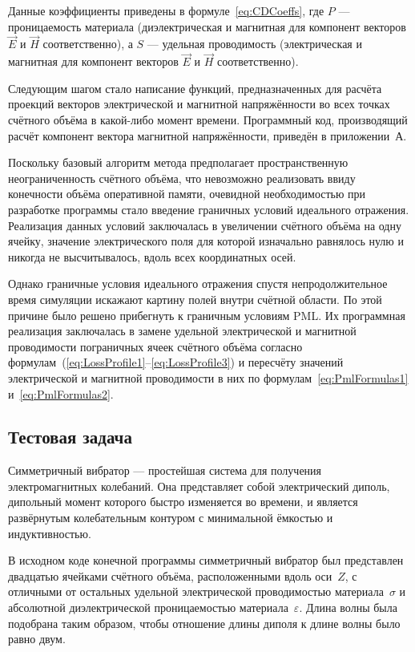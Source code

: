 Данные коэффициенты приведены в формуле~\eqref{eq:CDCoeffs}, где $ P $ --- проницаемость материала (диэлектрическая и магнитная для компонент векторов $\vec{E}$  и $\vec{H}$ соответственно), а $S$ --- удельная проводимость (электрическая и магнитная для компонент векторов $\vec{E}$  и $\vec{H}$ соответственно).

Следующим шагом стало написание функций, предназначенных для расчёта проекций векторов электрической и магнитной напряжённости во всех точках счётного объёма в какой-либо момент времени. Программный код, производящий расчёт компонент вектора магнитной напряжённости, приведён в приложении~А.

Поскольку базовый алгоритм метода предполагает пространственную неограниченность счётного объёма, что невозможно реализовать ввиду конечности объёма оперативной памяти, очевидной необходимостью при разработке программы стало введение граничных условий идеального отражения. Реализация данных условий заключалась в увеличении счётного объёма на одну ячейку, значение электрического поля для которой изначально равнялось нулю и никогда не высчитывалось, вдоль всех координатных осей.

Однако граничные условия идеального отражения спустя непродолжительное время симуляции искажают картину полей внутри счётной области. По этой причине было решено прибегнуть к граничным условиям PML. Их программная реализация заключалась в замене удельной электрической и магнитной проводимости пограничных ячеек счётного объёма согласно формулам~(\ref{eq:LossProfile1}--\ref{eq:LossProfile3}) и пересчёту значений электрической и магнитной проводимости в них по формулам~\ref{eq:PmlFormulas1} и~\ref{eq:PmlFormulas2}.

\subsection{Тестовая задача}

Симметричный вибратор --- простейшая система для получения электромагнитных колебаний. Она представляет собой электрический диполь, дипольный момент которого быстро изменяется во времени, и является развёрнутым колебательным контуром с минимальной ёмкостью и индуктивностью.

В исходном коде конечной программы симметричный вибратор был представлен двадцатью ячейками счётного объёма, расположенными вдоль оси~$ Z $, с отличными от остальных удельной электрической проводимостью материала~$\sigma$
и абсолютной диэлектрической проницаемостью материала~$\varepsilon$. Длина волны была подобрана таким образом, чтобы отношение длины диполя к длине волны было равно двум.


